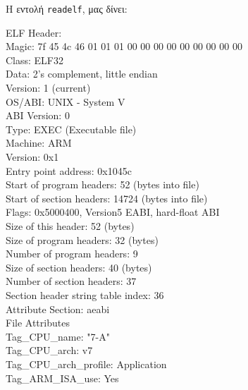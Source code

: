 \documentclass{article}
\newcommand{\english}[1]{\foreignlanguage{english}{{#1}}}
\begin{document}
Η εντολή \english{\texttt{readelf}}, μας δίνει:
\begin{otherlanguage}{english}
    \begin{tcolorbox}[width=\linewidth, colback={backcolour}, colupper=black]
        ELF Header: \\
        Magic:   7f 45 4c 46 01 01 01 00 00 00 00 00 00 00 00 00 \\
        Class:                             ELF32 \\
        Data:                              2's complement, little endian \\
        Version:                           1 (current) \\
        OS/ABI:                            UNIX - System V \\
        ABI Version:                       0 \\
        Type:                              EXEC (Executable file) \\
        Machine:                           ARM \\
        Version:                           0x1 \\
        Entry point address:               0x1045c \\
        Start of program headers:          52 (bytes into file) \\
        Start of section headers:          14724 (bytes into file) \\
        Flags:                             0x5000400, Version5 EABI, hard-float ABI \\
        Size of this header:               52 (bytes) \\
        Size of program headers:           32 (bytes) \\
        Number of program headers:         9 \\
        Size of section headers:           40 (bytes) \\
        Number of section headers:         37 \\
        Section header string table index: 36 \\
        Attribute Section: aeabi \\
        File Attributes \\
        Tag\_CPU\_name: "7-A" \\
        Tag\_CPU\_arch: v7 \\
        Tag\_CPU\_arch\_profile: Application \\
        Tag\_ARM\_ISA\_use: Yes \\

\end{tcolorbox}
\end{otherlanguage}
\end{document}
